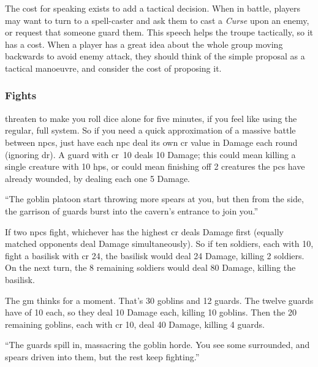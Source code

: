 \begin{multicols}{2}
The cost for speaking exists to add a tactical decision.
When in battle, players may want to turn to a spell-caster and ask them to cast a \textit{Curse} upon an enemy, or request that someone guard them.
This speech helps the troupe tactically, so it has a cost.
When a player has a great idea about the whole group moving backwards to avoid enemy attack, they should think of the simple proposal as a tactical manoeuvre, and consider the cost of proposing it.

\subsubsection{ Fights}
\label{npcfights}
threaten to make you roll dice alone for five minutes, if you feel like using the regular, full system.
So if you need a quick approximation of a massive battle between \glspl{npc}, just have each \gls{npc} deal its own \gls{cr} value in Damage each round (ignoring \gls{dr}).
A guard with \gls{cr}~10 deals 10 Damage; this could mean killing a single creature with 10 \glspl{hp}, or could mean finishing off 2 creatures the \glspl{pc} have already wounded, by dealing each one 5 Damage.

\begin{exampletext}
  ``The goblin platoon start throwing more spears at you, but then from the side, the garrison of guards burst into the cavern's entrance to join you.''
\end{exampletext}

If two \glspl{npc} fight, whichever has the highest \gls{cr} deals Damage first (equally matched opponents deal Damage simultaneously).
So if ten soldiers, each with  10, fight a basilisk with \gls{cr} 24, the basilisk would deal 24 Damage, killing 2 soldiers.
On the next turn, the 8 remaining soldiers would deal 80 Damage, killing the basilisk.

\begin{exampletext}

  The \gls{gm} thinks for a moment.
  That's 30 goblins and 12 guards.
  The twelve guards have  of 10 each, so they deal 10 Damage each, killing 10 goblins.
  Then the 20 remaining goblins, each with \gls{cr} 10, deal 40 Damage, killing 4 guards.

  ``The guards spill in, massacring the goblin horde.
  You see some surrounded, and spears driven into them, but the rest keep fighting.''

\end{exampletext}


\end{multicols}
